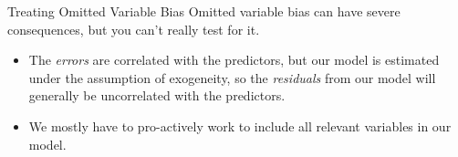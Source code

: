 \documentclass[10pt]{beamer}\usepackage[]{graphicx}\usepackage[]{color}
\begin{document}
{\begin{frame}{Treating Omitted Variable Bias}
  Omitted variable bias can have severe consequences, but you can't really test
  for it.
  \vb
  \begin{itemize}
  \item The \emph{errors} are correlated with the predictors, but our model is
    estimated under the assumption of exogeneity, so the \emph{residuals} from
    our model will generally be uncorrelated with the predictors.
    \vb
  \item We mostly have to pro-actively work to include all relevant variables in
    our model.
  \end{itemize}

\end{frame}

\watermarkoff %
}%
\end{document}
